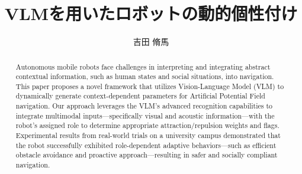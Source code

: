 \documentclass[a4paper, 8pt]{styles/ozakilab_seminar}
\begin{document}
 
\title{VLMを用いたロボットの動的個性付け}
\author{吉田 脩馬}

\begin{abstract}
Autonomous mobile robots face challenges in interpreting and integrating abstract contextual information, such as human states and social situations, into navigation. 
This paper proposes a novel framework that utilizes Vision-Language Model (VLM) to dynamically generate context-dependent parameters for Artificial Potential Field navigation.
Our approach leverages the VLM's advanced recognition capabilities to integrate multimodal inputs—specifically visual and acoustic information—with the robot's assigned role to determine appropriate attraction/repulsion weights and flags. 
Experimental results from real-world trials on a university campus demonstrated that the robot successfully exhibited role-dependent adaptive behaviors—such as efficient obstacle avoidance and proactive approach—resulting in safer and socially compliant navigation.
\end{abstract}

\maketitle



\end{document}
